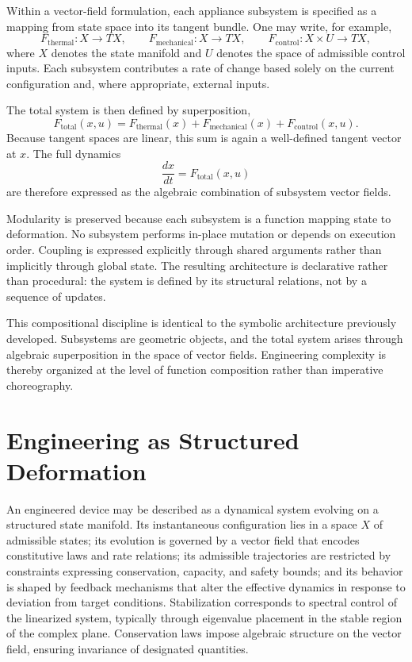 \documentclass[12pt]{book}
\begin{document}
Within a vector-field formulation, each appliance subsystem is
specified as a mapping from state space into its tangent bundle. One
may write, for example,
\[
F_{\text{thermal}} : X \to TX,
\qquad
F_{\text{mechanical}} : X \to TX,
\qquad
F_{\text{control}} : X \times U \to TX,
\]
where $X$ denotes the state manifold and $U$ denotes the space of
admissible control inputs. Each subsystem contributes a rate of change
based solely on the current configuration and, where appropriate,
external inputs.

The total system is then defined by superposition,
\[
F_{\text{total}}(x,u)
=
F_{\text{thermal}}(x)
+
F_{\text{mechanical}}(x)
+
F_{\text{control}}(x,u).
\]
Because tangent spaces are linear, this sum is again a well-defined
tangent vector at $x$. The full dynamics
\[
\frac{dx}{dt} = F_{\text{total}}(x,u)
\]
are therefore expressed as the algebraic combination of subsystem
vector fields.

Modularity is preserved because each subsystem is a function mapping
state to deformation. No subsystem performs in-place mutation or
depends on execution order. Coupling is expressed explicitly through
shared arguments rather than implicitly through global state. The
resulting architecture is declarative rather than procedural: the
system is defined by its structural relations, not by a sequence of
updates.

This compositional discipline is identical to the symbolic
architecture previously developed. Subsystems are geometric objects,
and the total system arises through algebraic superposition in the
space of vector fields. Engineering complexity is thereby organized at
the level of function composition rather than imperative choreography.

\section{Engineering as Structured Deformation}

An engineered device may be described as a dynamical system evolving on
a structured state manifold. Its instantaneous configuration lies in a
space $X$ of admissible states; its evolution is governed by a vector
field that encodes constitutive laws and rate relations; its admissible
trajectories are restricted by constraints expressing conservation,
capacity, and safety bounds; and its behavior is shaped by feedback
mechanisms that alter the effective dynamics in response to deviation
from target conditions. Stabilization corresponds to spectral control
of the linearized system, typically through eigenvalue placement in the
stable region of the complex plane. Conservation laws impose algebraic
structure on the vector field, ensuring invariance of designated
quantities.
\end{document}
